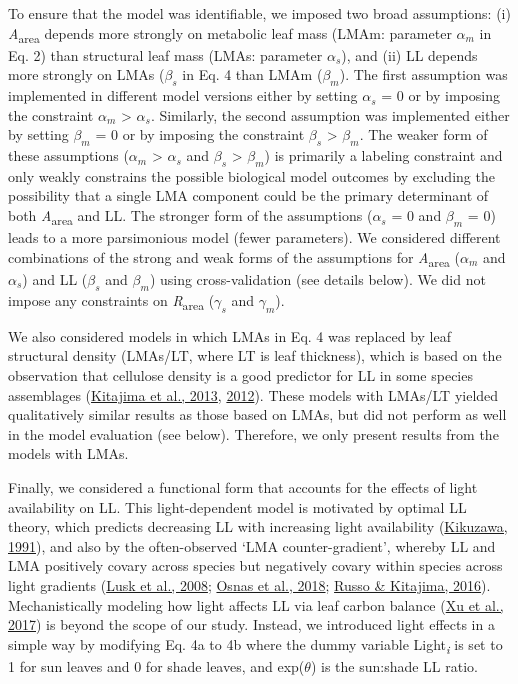 \documentclass[
  12pt,
  letterpaper,
  DIV=11,
  numbers=noendperiod]{scrartcl}
\begin{document}
To ensure that the model was identifiable, we imposed two broad
assumptions: (i) \emph{A}\textsubscript{area} depends more strongly on
metabolic leaf mass (LMAm: parameter \(\alpha_m\) in Eq. 2) than
structural leaf mass (LMAs: parameter \(\alpha_s\)), and (ii) LL depends
more strongly on LMAs (\(\beta_s\) in Eq. 4 than LMAm (\(\beta_m\)). The
first assumption was implemented in different model versions either by
setting \(\alpha_s\) = 0 or by imposing the constraint \(\alpha_m\)
\textgreater{} \(\alpha_s\). Similarly, the second assumption was
implemented either by setting \(\beta_m\) = 0 or by imposing the
constraint \(\beta_s\) \textgreater{} \(\beta_m\). The weaker form of
these assumptions (\(\alpha_m\) \textgreater{} \(\alpha_s\) and
\(\beta_s\) \textgreater{} \(\beta_m\)) is primarily a labeling
constraint and only weakly constrains the possible biological model
outcomes by excluding the possibility that a single LMA component could
be the primary determinant of both \emph{A}\textsubscript{area} and LL.
The stronger form of the assumptions (\(\alpha_s\) = 0 and \(\beta_m\) =
0) leads to a more parsimonious model (fewer parameters). We considered
different combinations of the strong and weak forms of the assumptions
for \emph{A}\textsubscript{area} (\(\alpha_m\) and \(\alpha_s\)) and LL
(\(\beta_s\) and \(\beta_m\)) using cross-validation (see details
below). We did not impose any constraints on
\emph{R}\textsubscript{area} (\(\gamma_s\) and \(\gamma_m\)).

We also considered models in which LMAs in Eq. 4 was replaced by leaf
structural density (LMAs/LT, where LT is leaf thickness), which is based
on the observation that cellulose density is a good predictor for LL in
some species assemblages (\protect\hyperlink{ref-Kitajima2013}{Kitajima
et al., 2013}, \protect\hyperlink{ref-Kitajima2012}{2012}). These models
with LMAs/LT yielded qualitatively similar results as those based on
LMAs, but did not perform as well in the model evaluation (see below).
Therefore, we only present results from the models with LMAs.

Finally, we considered a functional form that accounts for the effects
of light availability on LL. This light-dependent model is motivated by
optimal LL theory, which predicts decreasing LL with increasing light
availability (\protect\hyperlink{ref-Kikuzawa1991}{Kikuzawa, 1991}), and
also by the often-observed `LMA counter-gradient', whereby LL and LMA
positively covary across species but negatively covary within species
across light gradients (\protect\hyperlink{ref-Lusk2008}{Lusk et al.,
2008}; \protect\hyperlink{ref-Osnas2018}{Osnas et al., 2018};
\protect\hyperlink{ref-Russo2016}{Russo \& Kitajima, 2016}).
Mechanistically modeling how light affects LL via leaf carbon balance
(\protect\hyperlink{ref-Xu2017}{Xu et al., 2017}) is beyond the scope of
our study. Instead, we introduced light effects in a simple way by
modifying Eq. 4a to 4b where the dummy variable
Light\textsubscript{\emph{i}} is set to 1 for sun leaves and 0 for shade
leaves, and exp(\(\theta\)) is the sun:shade LL ratio.
\end{document}
